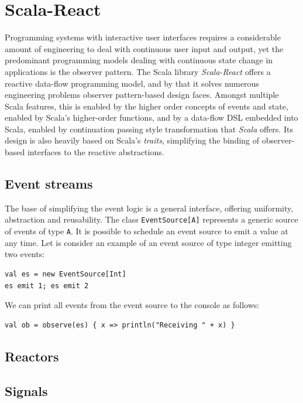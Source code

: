 \section{Scala-React}\label{sec:scala-react}

Programming systems with interactive user interfaces requires a considerable amount of engineering to deal with continuous user input and output, yet the predominant programming models dealing with continuous state change in applications is the observer pattern. The Scala library \emph{Scala-React} offers a reactive data-flow programming model, and by that it solves numerous engineering problems observer pattern-based design faces. Amongst multiple Scala features, this is enabled by the higher order concepts of events and state, enabled by Scala's higher-order functions, and by a data-flow DSL embedded into Scala, enabled by continuation passing style transformation that \emph{Scala} offers. Its design is also heavily based on Scala's \emph{traits}, simplifying the binding of observer-based interfaces to the reactive abstractions.\cite{DeprecatingObservers}

\subsection{Event streams}

The base of simplifying the event logic is a general interface, offering uniformity, abstraction and reusability. The class {\tt EventSource[A]} represents a generic source of events of type {\tt A}. It is possible to schedule an event source to emit a value at any time. Let is consider an example of an event source of type integer emitting two events:
\begin{lstlisting}
val es = new EventSource[Int]
es emit 1; es emit 2
\end{lstlisting}

We can print all events from the event source to the console as follows:
\begin{lstlisting}
val ob = observe(es) { x => println("Receiving " + x) }
\end{lstlisting}

\subsection{Reactors}

\subsection{Signals}





















